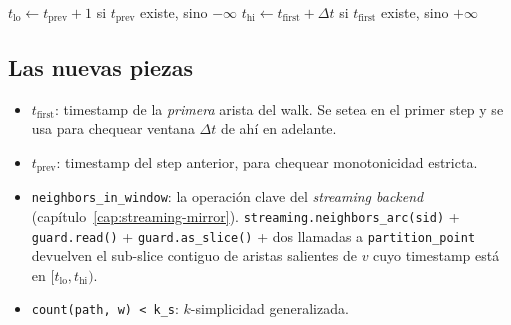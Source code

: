 \begin{algorithm}[H]
\caption{DFS subgraph match temporal de GraphHunter (versión simplificada)}
\BlankLine
{}
\(t_{\mathrm{lo}} \leftarrow t_{\mathrm{prev}} + 1\) si \(t_{\mathrm{prev}}\) existe, sino \(-\infty\)\;
\(t_{\mathrm{hi}} \leftarrow t_{\mathrm{first}} + \Delta t\) si \(t_{\mathrm{first}}\) existe, sino \(+\infty\)\;
\end{algorithm}

\subsection{Las nuevas piezas}

\begin{itemize}
    \item \(t_{\mathrm{first}}\): timestamp de la \emph{primera}
    arista del walk. Se setea en el primer step y se usa para
    chequear ventana \(\Delta t\) de ahí en adelante.
    \item \(t_{\mathrm{prev}}\): timestamp del step anterior, para
    chequear monotonicidad estricta.
    \item \texttt{neighbors\_in\_window}: la operación clave del
    \emph{streaming backend} (capítulo~\ref{cap:streaming-mirror}).
    \texttt{streaming.neighbors\_arc(sid)} + \texttt{guard.read()} +
    \texttt{guard.as\_slice()} + dos llamadas a
    \texttt{partition\_point} devuelven el sub-slice contiguo de
    aristas salientes de \(v\) cuyo timestamp está en
    \([t_{\mathrm{lo}}, t_{\mathrm{hi}})\).
    \item \texttt{count(path, w) < k\_s}: \(k\)-simplicidad
    generalizada.
\end{itemize}

